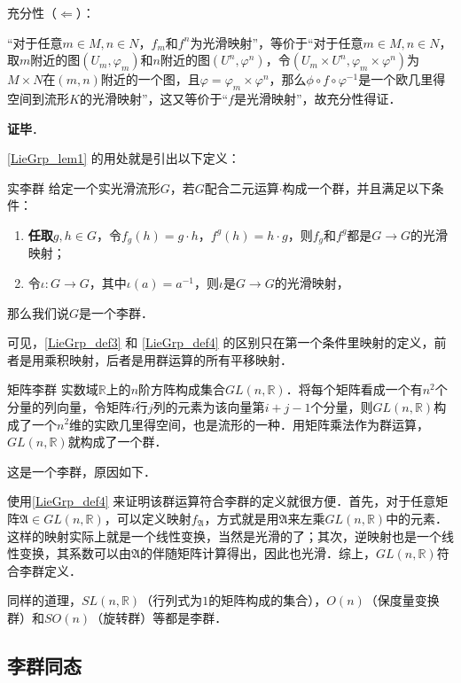 充分性（$\Leftarrow$）：

“对于任意$m\in M, n\in N$，$f_m$和$f^n$为光滑映射”，等价于“对于任意$m\in M, n\in N$，取$m$附近的图$(U_m, \varphi_m)$和$n$附近的图$(U^n, \varphi^n)$，令$(U_m\times U^n, \varphi_m\times\varphi^n)$为$M\times N$在$(m, n)$附近的一个图，且$\varphi=\varphi_m\times\varphi^n$，那么$\phi\circ f\circ\varphi^{-1}$是一个欧几里得空间到流形$K$的光滑映射”，这又等价于“$f$是光滑映射”，故充分性得证．

\textbf{证毕}．

\autoref{LieGrp_lem1} 的用处就是引出以下定义：

\begin{definition}{实李群}\label{LieGrp_def4}
给定一个实光滑流形$G$，若$G$配合二元运算$\cdot$构成一个群，并且满足以下条件：
\begin{enumerate}
\item \textbf{任取}$g, h\in G$，令$f_g(h)=g\cdot h$，$f^g(h)=h\cdot g$，则$f_g$和$f^g$都是$G\to G$的光滑映射；
\item 令$\iota:G\to G$，其中$\iota(a)=a^{-1}$，则$\iota$是$G\to G$的光滑映射，
\end{enumerate}
那么我们说$G$是一个李群．
\end{definition}

可见，\autoref{LieGrp_def3} 和 \autoref{LieGrp_def4} 的区别只在第一个条件里映射的定义，前者是用乘积映射，后者是用群运算的所有平移映射．

\begin{example}{矩阵李群}
实数域$\mathbb{R}$上的$n$阶方阵构成集合$GL(n, \mathbb{R})$．将每个矩阵看成一个有$n^2$个分量的列向量，令矩阵$i$行$j$列的元素为该向量第$i+j-1$个分量，则$GL(n, \mathbb{R})$构成了一个$n^2$维的实欧几里得空间，也是流形的一种．用矩阵乘法作为群运算，$GL(n, \mathbb{R})$就构成了一个群．

这是一个李群，原因如下．

使用\autoref{LieGrp_def4} 来证明该群运算符合李群的定义就很方便．首先，对于任意矩阵$\mathfrak{A}\in GL(n, \mathbb{R})$，可以定义映射$f_\mathfrak{A}$，方式就是用$\mathfrak{A}$来左乘$GL(n, \mathbb{R})$中的元素．这样的映射实际上就是一个线性变换，当然是光滑的了；其次，逆映射也是一个线性变换，其系数可以由$\mathfrak{A}$的伴随矩阵计算得出，因此也光滑．综上，$GL(n, \mathbb{R})$符合李群定义．

同样的道理，$SL(n, \mathbb{R})$（行列式为$1$的矩阵构成的集合），$O(n)$（保度量变换群）和$SO(n)$（旋转群）等都是李群．
\end{example}


\subsection{李群同态}

